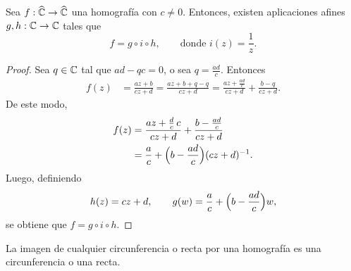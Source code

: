 \begin{proposition}
    Sea $f:\widehat{\mathbb{C}}\to\widehat{\mathbb{C}}$ una homografía con $c\neq 0$. Entonces, existen aplicaciones afines $g,h:\mathbb{C}\to\mathbb{C}$ tales que
    \begin{equation*}
        f = g \circ i \circ h, \qquad \text{donde } i(z)=\frac{1}{z}.
    \end{equation*}
\end{proposition}

\begin{proof}
    Sea $q \in \mathbb{C}$ tal que $ad - qc = 0$, o sea $q = \frac{ad}{c}$. Entonces
    \begin{align*}
        f(z) &= \frac{az+b}{cz+d} 
        = \frac{az+b+q-q}{cz+d} 
        = \frac{az+\tfrac{ad}{c}}{cz+d} + \frac{b-q}{cz+d}.
    \end{align*}
    De este modo,
    \begin{align*}
        f(z) &= \frac{az+\tfrac{d}{c}\,c}{cz+d} + \frac{b-\tfrac{ad}{c}}{cz+d} \\
             &= \frac{a}{c} + \Bigl(b-\frac{ad}{c}\Bigr)(cz+d)^{-1}.
    \end{align*}
    Luego, definiendo
    \[
        h(z) = cz+d, 
        \qquad g(w) = \frac{a}{c} + \Bigl(b-\frac{ad}{c}\Bigr)w,
    \]
    se obtiene que $f = g \circ i \circ h$.
\end{proof}

\begin{proposition}
    La imagen de cualquier circunferencia o recta por una homografía es una circunferencia o una recta.
\end{proposition}

